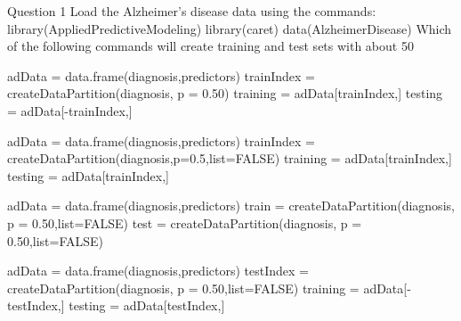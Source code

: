 
Question 1
Load the Alzheimer's disease data using the commands:
library(AppliedPredictiveModeling)
library(caret)
data(AlzheimerDisease)
Which of the following commands will create training and test sets with about 50%

adData = data.frame(diagnosis,predictors)
trainIndex = createDataPartition(diagnosis, p = 0.50)
training = adData[trainIndex,]
testing = adData[-trainIndex,]
 
adData = data.frame(diagnosis,predictors)
trainIndex = createDataPartition(diagnosis,p=0.5,list=FALSE)
training = adData[trainIndex,]
testing = adData[trainIndex,]
 
adData = data.frame(diagnosis,predictors)
train = createDataPartition(diagnosis, p = 0.50,list=FALSE)
test = createDataPartition(diagnosis, p = 0.50,list=FALSE)
 
adData = data.frame(diagnosis,predictors)
testIndex = createDataPartition(diagnosis, p = 0.50,list=FALSE)
training = adData[-testIndex,]
testing = adData[testIndex,]

